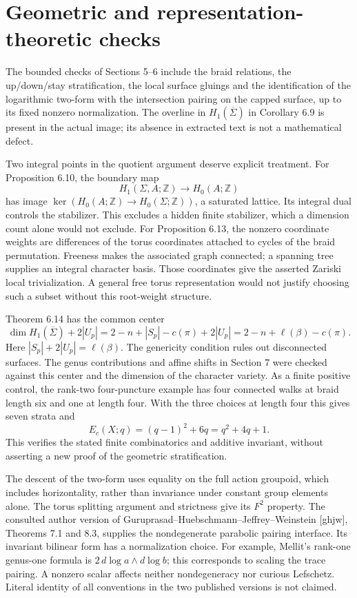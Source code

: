\documentclass[10pt]{article}
\begin{document}
\section*{Geometric and representation-theoretic checks}
The bounded checks of Sections 5–6 include the braid relations, the up/down/stay stratification, the local surface gluings and the identification of the logarithmic two-form with the intersection pairing on the capped surface, up to its fixed nonzero normalization. The overline in \(H_1(\overline\Sigma)\) in Corollary 6.9 is present in the actual image; its absence in extracted text is not a mathematical defect.\par
Two integral points in the quotient argument deserve explicit treatment. For Proposition 6.10, the boundary map \[H_1(\Sigma,A;\mathbb Z)\longrightarrow H_0(A;\mathbb Z)\] has image \(\ker(H_0(A;\mathbb Z)\to H_0(\Sigma;\mathbb Z))\), a saturated lattice. Its integral dual controls the stabilizer. This excludes a hidden finite stabilizer, which a dimension count alone would not exclude. For Proposition 6.13, the nonzero coordinate weights are differences of the torus coordinates attached to cycles of the braid permutation. Freeness makes the associated graph connected; a spanning tree supplies an integral character basis. Those coordinates give the asserted Zariski local trivialization. A general free torus representation would not justify choosing such a subset without this root-weight structure.\par
Theorem 6.14 has the common center \[\dim H_1(\overline\Sigma)+2|U_p|
   =2-n+|S_p|-c(\pi)+2|U_p|
   =2-n+\ell(\beta)-c(\pi).\] Here \(|S_p|+2|U_p|=\ell(\beta)\). The genericity condition rules out disconnected surfaces. The genus contributions and affine shifts in Section 7 were checked against this center and the dimension of the character variety. As a finite positive control, the rank-two four-puncture example has four connected walks at braid length six and one at length four. With the three choices at length four this gives seven strata and \[E_c(X;q)=(q-1)^2+6q=q^2+4q+1.\] This verifies the stated finite combinatorics and additive invariant, without asserting a new proof of the geometric stratification.\par
The descent of the two-form uses equality on the full action groupoid, which includes horizontality, rather than invariance under constant group elements alone. The torus splitting argument and strictness give its \(F^2\) property. The consulted author version of Guruprasad–Huebschmann–Jeffrey–Weinstein [ghjw], Theorems 7.1 and 8.3, supplies the nondegenerate parabolic pairing interface. Its invariant bilinear form has a normalization choice. For example, Mellit’s rank-one genus-one formula is \(2\,d\log a\wedge d\log b\); this corresponds to scaling the trace pairing. A nonzero scalar affects neither nondegeneracy nor curious Lefschetz. Literal identity of all conventions in the two published versions is not claimed.\par
\end{document}
